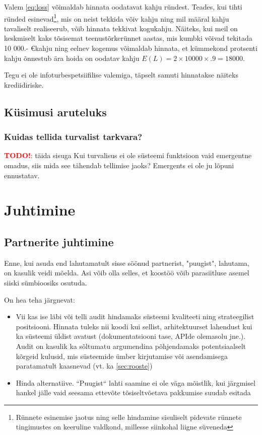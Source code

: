 \documentclass{tufte-book}
\newcommand{\TODO}{\textcolor{red}{\bf TODO!}\xspace}
\begin{document}
Valem \ref{eq:loss} võimaldab hinnata oodatavat kahju ründest. Teades, kui tihti ründed esinevad\footnote{Rünnete esinemise jaotus ning selle hindamine sisuliselt pidevate rünnete tingimustes on keeruline valdkond, millesse siinkohal liigne süveneda}, mis on neist tekkida võiv kahju ning mil määral kahju tavaliselt realiseerub, võib hinnata tekkivat kogukahju. Näiteks, kui meil on keskmiselt kaks tõsisemat teenustõrkerünnet aastas, mis kumbki võivad tekitada 10 000.- \euro kahju ning eelnev kogemus võimaldab hinnata, et kümmekond protsenti kahju õnnestub ära hoida on oodatav kahju $E(L)=2 \times 10000 \times .9 = 18 000$. 

Tegu ei ole infoturbespetsiifilise valemiga, täpselt samuti hinnatakse näiteks krediidiriske.



\section{Küsimusi aruteluks}
\subsection{Kuidas tellida turvalist tarkvara?}
\TODO: täida sisuga
Kui turvalisus ei ole süsteemi funktsioon vaid emergentne omadus, siis mida see tähendab tellimise jaoks? Emergents ei ole ju lõpuni ennustatav.


\chapter{Juhtimine}
\section{Partnerite juhtimine}
Enne, kui asuda end lahutamatult sisse söönud partnerist, "puugist", lahutama, on kasulik veidi mõelda. Asi võib olla selles, et koostöö võib parasiitluse asemel siiski sümbioosiks osutuda. 

On hea teha järgnevat:
\begin{itemize}
	\item Vii kas ise läbi või telli audit hindamaks süsteemi kvaliteeti ning strateegilist positsiooni. Hinnata tuleks nii koodi kui sellist, arhitektuurset lahendust kui ka süsteemi üldist avatust (dokumentatsiooni tase, APIde olemasolu jne.). Audit on kasulik ka sõltumatu argumendina põhjendamaks potentsiaalselt kõrgeid kulusid, mis süsteemide ümber kirjutamise või asendamisega paratamatult kaasnevad (vt. ka \ref{sec:rooste})
	\item Hinda alternatiive. ``Puugist`` lahti saamine ei ole väga mõistlik, kui järgmisel hankel jälle vaid seesama ettevõte tõsiseltvõetava pakkumise suudab esitada  
\end{itemize}
\end{document}
